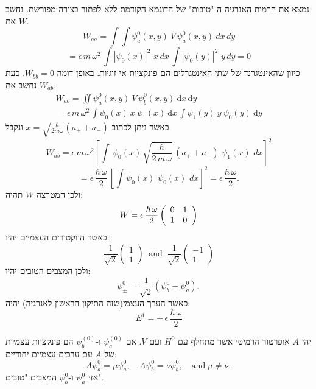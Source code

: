 \documentclass{tstextbook}
\begin{document}
\begin{example}
נמצא את הרמות האנרגיה ה-"טובות" של הדוגמא הקודמת ללא לפתור בצורה מפורשת. נחשב את \(W\).
$$W_{a a}=\int\int\psi_{a}^{0}(x,y)\ V\,\psi_{a}^{0}(x,y)\ d x\,d y$$$$=\epsilon\,m\,\omega^{2}\,\int|\psi_{0}(x)|^{2}\,\,x\,d x\,\int|\psi_{0}(y)|^{2}\,\,y\,d y=0$$
כיוון שהאינטגרנד של שתי האינטגרלים הם פונקציות אי זוגיות. באופן דומה \(W_{bb}=0\). כעת נחשב את \(W_{ab}\):
$$\begin{gather}W_{a b}=\iint\psi_{a}^{0}(x,y)\ V\,\psi_{b}^{0}(x,y)\ \mathrm{d} x\,\mathrm{d} y\\=\epsilon\,m\,\omega^{2}\,\int\psi_{0}(x)\ x\ \psi_{1}(x)\ \mathrm{d} x\,\int\psi_{1}(y)\ y\ \psi_{0}(y)\ \mathrm{d} y 
\end{gather}$$
כאשר ניתן לכתוב \(x=\sqrt{ \frac{\hbar}{2m\omega} }(a_{+}+a_{-})\) ונקבל:
$$W_{a b}=\epsilon\,m\,\omega^{2}\left[\int\,\psi_{0}(x)\,\sqrt{\frac{\hbar}{2\,m\,\omega}}\,(a_{+}+a_{-})\,\,\psi_{1}(x)\,\,d x\right]^{2}$$$$=\epsilon\,\frac{\hbar\,\omega}{2}\,\left[\int\psi_{0}(x)\,\,\psi_{0}(x)\,\,d x\right]^{2}=\epsilon\,\frac{\hbar\,\omega}{2}.$$
ולכן המטרצה \(W\) תהיה:
$$W=\epsilon\,\frac{\hbar\,\omega}{2}\left(\begin{array}{l l}{{0}}&{{1}}\\ {{1}}&{{0}}\end{array}\right)$$
כאשר הווקטורים העצמיים יהיו:
$${\frac{1}{\sqrt{2}}}{\left(\begin{array}{l}{1}\\ {1}\end{array}\right)}\;\;\mathrm{and}\;\;{\frac{1}{\sqrt{2}}}{\left(\begin{array}{l}{-1}\\ {1}\end{array}\right)}$$
ולכן המצבים הטובים יהיו:
$$\psi_{\pm}^{0}=\frac{1}{\sqrt{2}}\left(\psi_{b}^{0}\pm\psi_{a}^{0}\right),$$
כאשר הערך העצמי(שזה התיקון הראשון לאנרגיה) יהיה:
$$E^{1}=\pm\,\epsilon\,\frac{\hbar\,\omega}{2}$$

\end{example}
\begin{proposition}
יהי \(A\) אופרטור הרמיטי אשר מתחלף עם \(H^{0}\) ועם \(V\). אם \(\psi_{a}^{(0)}\) ו-\(\psi_{b}^{(0)}\) הם פונקציות עצמיות של \(A\) עם ערכים עצמיים יחודיים:
$$A\psi_{a}^{0}=\mu\psi_{a}^{0},\quad A\psi_{b}^{0}=\nu\psi_{b}^{0},\quad\mathrm{and}\;\mu\neq\nu,$$
אזי \(\psi_{a}^{0}\) ו-\(\psi_{b}^{0}\) המצבים "טובים".

\end{proposition}
\end{document}
